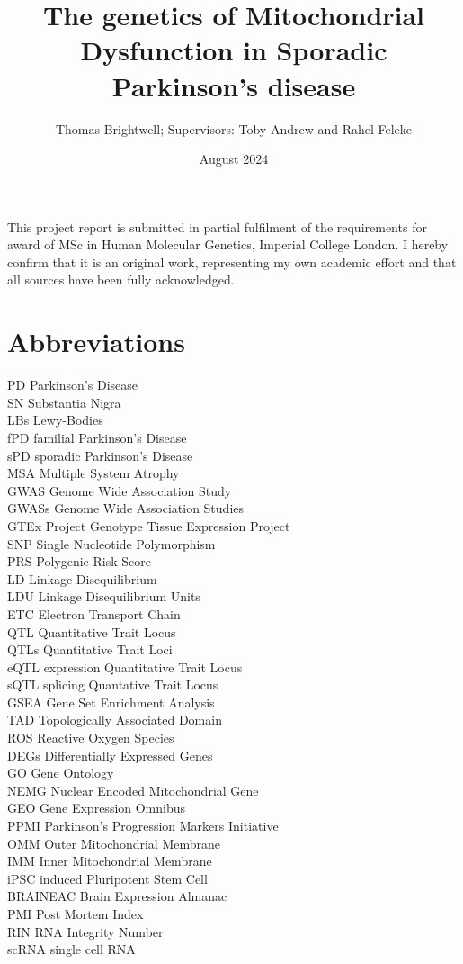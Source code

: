 \documentclass{article}
\title{The genetics of Mitochondrial Dysfunction in Sporadic Parkinson's disease}
\author{Thomas Brightwell; Supervisors: Toby Andrew and Rahel Feleke}
\date{August 2024}
\begin{document}
\maketitle
This project
report is submitted in partial fulfilment of the requirements for award of MSc in Human Molecular
Genetics, Imperial College London. I hereby confirm that it is an original work, representing my
own academic effort and that all sources have been fully acknowledged.
\newpage
\begin{abstract}
\end{abstract}
\renewcommand{\abstractname}{Acknowledgements}
\begin{abstract}
\end{abstract}
\newpage
\tableofcontents
\section{Abbreviations}
PD Parkinson's Disease
\\SN Substantia Nigra
\\LBs Lewy-Bodies
\\fPD familial Parkinson's Disease
\\sPD sporadic Parkinson's Disease
\\MSA Multiple System Atrophy
\\GWAS Genome Wide Association Study
\\GWASs Genome Wide Association Studies
\\GTEx Project Genotype Tissue Expression Project
\\SNP Single Nucleotide Polymorphism
\\PRS Polygenic Risk Score
\\LD Linkage Disequilibrium
\\LDU Linkage Disequilibrium Units
\\ETC Electron Transport Chain
\\QTL Quantitative Trait Locus
\\QTLs Quantitative Trait Loci
\\eQTL expression Quantitative Trait Locus
\\sQTL splicing Quantative Trait Locus
\\GSEA Gene Set Enrichment Analysis
\\TAD Topologically Associated Domain
\\ROS Reactive Oxygen Species
\\DEGs Differentially Expressed Genes
\\GO Gene Ontology
\\NEMG Nuclear Encoded Mitochondrial Gene
\\GEO Gene Expression Omnibus
\\PPMI Parkinson's Progression Markers Initiative
\\OMM Outer Mitochondrial Membrane
\\IMM Inner Mitochondrial Membrane
\\iPSC induced Pluripotent Stem Cell
\\BRAINEAC Brain Expression Almanac
\\PMI Post Mortem Index
\\RIN RNA Integrity Number
\\scRNA single cell RNA
\end{document}
